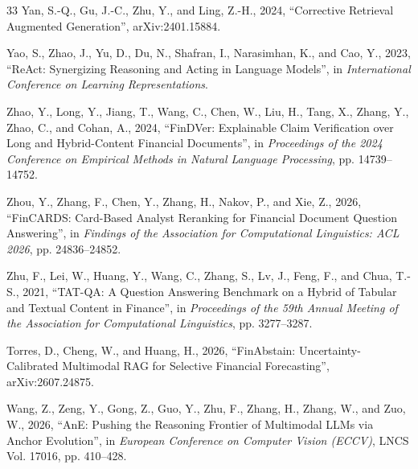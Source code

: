 \begin{thebibliography}{33}
Yan, S.-Q., Gu, J.-C., Zhu, Y., and Ling, Z.-H., 2024, ``Corrective Retrieval Augmented Generation'', arXiv:2401.15884.

Yao, S., Zhao, J., Yu, D., Du, N., Shafran, I., Narasimhan, K., and Cao, Y., 2023, ``ReAct: Synergizing Reasoning and Acting in Language Models'', in \emph{International Conference on Learning Representations}.

Zhao, Y., Long, Y., Jiang, T., Wang, C., Chen, W., Liu, H., Tang, X., Zhang, Y., Zhao, C., and Cohan, A., 2024, ``FinDVer: Explainable Claim Verification over Long and Hybrid-Content Financial Documents'', in \emph{Proceedings of the 2024 Conference on Empirical Methods in Natural Language Processing}, pp. 14739--14752.

Zhou, Y., Zhang, F., Chen, Y., Zhang, H., Nakov, P., and Xie, Z., 2026, ``FinCARDS: Card-Based Analyst Reranking for Financial Document Question Answering'', in \emph{Findings of the Association for Computational Linguistics: ACL 2026}, pp. 24836--24852.

Zhu, F., Lei, W., Huang, Y., Wang, C., Zhang, S., Lv, J., Feng, F., and Chua, T.-S., 2021, ``TAT-QA: A Question Answering Benchmark on a Hybrid of Tabular and Textual Content in Finance'', in \emph{Proceedings of the 59th Annual Meeting of the Association for Computational Linguistics}, pp. 3277--3287.

Torres, D., Cheng, W., and Huang, H., 2026, ``FinAbstain: Uncertainty-Calibrated Multimodal RAG for Selective Financial Forecasting'', arXiv:2607.24875.

Wang, Z., Zeng, Y., Gong, Z., Guo, Y., Zhu, F., Zhang, H., Zhang, W., and Zuo, W., 2026, ``AnE: Pushing the Reasoning Frontier of Multimodal LLMs via Anchor Evolution'', in \emph{European Conference on Computer Vision (ECCV)}, LNCS Vol. 17016, pp. 410--428.

\end{thebibliography}

